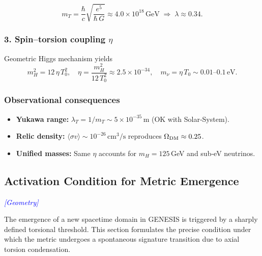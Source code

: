 \documentclass{article}
\newcommand{\geometrytag}{\textcolor{blue}{\textit{[Geometry]}}}
\begin{document}
\begin{equation}\label{eq:auto37}
m_T = \frac{\hbar}{c}\sqrt{\frac{e^5}{\hbar\,G}}
      \approx4.0\times10^{18}\,\mathrm{GeV}
  \;\Longrightarrow\;
  \lambda\approx0.34.
\end{equation}

\subsubsection*{3. Spin–torsion coupling $\eta$}
Geometric Higgs mechanism yields
\begin{equation}\label{eq:auto38} 
m_H^2 = 12\,\eta\,T_0^2,
  \quad
  \eta = \frac{m_H^2}{12\,T_0^2}
       \approx2.5\times10^{-34},
  \quad
  m_\nu = \eta\,T_0 \sim0.01\text{–}0.1\,\mathrm{eV}.
\end{equation}

\subsubsection*{Observational consequences}
\begin{itemize}
  \item \textbf{Yukawa range:} $\lambda_T = 1/m_T \sim 5\times10^{-35}\,$m (OK with Solar‐System).
  \item \textbf{Relic density:} $\langle\sigma v\rangle\sim10^{-26}\,\mathrm{cm^3/s}$ reproduces $\Omega_{\rm DM}\approx0.25$.
  \item \textbf{Unified masses:} Same $\eta$ accounts for $m_H=125\,$GeV and sub‐eV neutrinos.
\end{itemize}




\subsection{Activation Condition for Metric Emergence}
\label{sec:activation-condition}
\geometrytag


The emergence of a new spacetime domain in GENESIS is triggered by a sharply defined torsional threshold. This section formulates the precise condition under which the metric undergoes a spontaneous signature transition due to axial torsion condensation.
\end{document}
